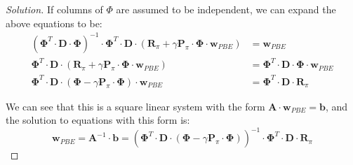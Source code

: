 \documentclass[12pt]{article}
\newenvironment{solution}
  {\renewcommand\qedsymbol{$\blacksquare$}\begin{proof}[Solution]}
  {\end{proof}}
\begin{document}
\begin{solution}
If columns of $\Phi$ are assumed to be independent, we can expand the above equations to be:
\begin{equation}
	\begin{aligned}
	\left(\boldsymbol{\Phi}^{T} \cdot \mathbf{D} \cdot \boldsymbol{\Phi}\right)^{-1} \cdot \boldsymbol{\Phi}^{T} \cdot \mathbf{D} \cdot\left(\mathbf{R}_{\pi}+\gamma \mathbf{P}_{\pi} \cdot \boldsymbol{\Phi} \cdot \mathbf{w}_{P B E}\right) &=\mathbf{w}_{P B E} \\
	\boldsymbol{\Phi}^{T} \cdot \mathbf{D} \cdot\left(\mathbf{R}_{\pi}+\gamma \mathbf{P}_{\pi} \cdot \boldsymbol{\Phi} \cdot \mathbf{w}_{P B E}\right) &=\boldsymbol{\Phi}^{T} \cdot \mathbf{D} \cdot \boldsymbol{\Phi} \cdot \mathbf{w}_{P B E} \\
	\boldsymbol{\Phi}^{T} \cdot \mathbf{D} \cdot\left(\boldsymbol{\Phi}-\gamma \mathbf{P}_{\pi} \cdot \boldsymbol{\Phi}\right) \cdot \mathbf{w}_{P B E} &=\boldsymbol{\Phi}^{T} \cdot \mathbf{D} \cdot \mathbf{R}_{\pi}
	\end{aligned}
\end{equation}

We can see that this is a square linear system with the form $\mathbf{A} \cdot \mathbf{w}_{P B E}=\mathbf{b}$, and the solution to equations with this form is:
\begin{equation}
	\mathbf{w}_{P B E}=\mathbf{A}^{-1} \cdot \mathbf{b}=\left(\mathbf{\Phi}^{T} \cdot \mathbf{D} \cdot\left(\boldsymbol{\Phi}-\gamma \mathbf{P}_{\pi} \cdot \boldsymbol{\Phi}\right)\right)^{-1} \cdot \boldsymbol{\Phi}^{T} \cdot \mathbf{D} \cdot \mathbf{R}_{\pi}
\end{equation}
\end{solution}
\end{document}
